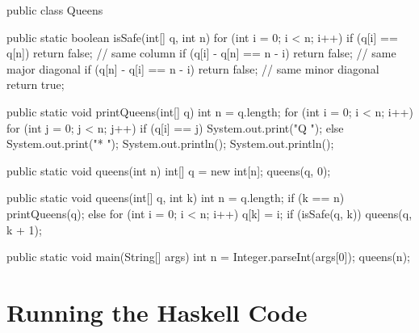 \begin{javacode}
public class Queens {
  public static boolean isSafe(int[] q, int n) {
    for (int i = 0; i < n; i++) {
      if (q[i] == q[n]) return false;         // same column
      if (q[i] - q[n] == n - i) return false; // same major diagonal
      if (q[n] - q[i] == n - i) return false; // same minor diagonal
    }
    return true;
  }

  public static void printQueens(int[] q) {
    int n = q.length;
    for (int i = 0; i < n; i++) {
      for (int j = 0; j < n; j++) {
        if (q[i] == j) System.out.print("Q ");
        else           System.out.print("* ");
      }
      System.out.println();
    }
    System.out.println();
  }

  public static void queens(int n) {
    int[] q = new int[n];
    queens(q, 0);
  }

  public static void queens(int[] q, int k) {
    int n = q.length;
    if (k == n) printQueens(q);
    else {
      for (int i = 0; i < n; i++) {
        q[k] = i;
        if (isSafe(q, k)) queens(q, k + 1);
      }
    }
  }

  public static void main(String[] args) {
    int n = Integer.parseInt(args[0]);
    queens(n);
  }
}
\end{javacode}

\section{Running the Haskell Code}

